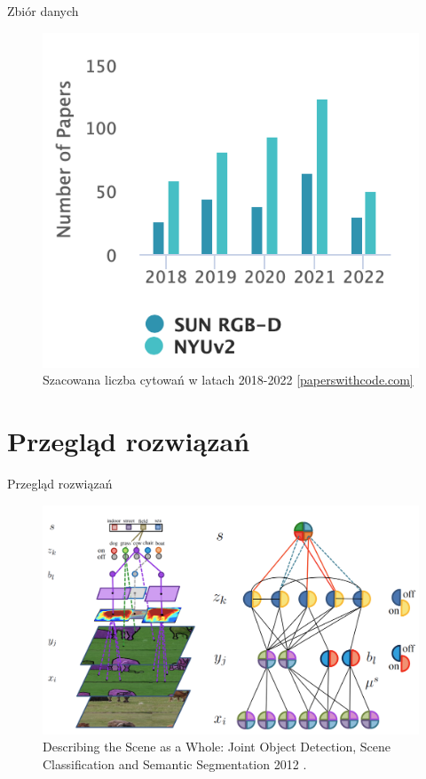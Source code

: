 \documentclass[10pt]{beamer}
\begin{document}
\begin{frame}{Zbiór danych}
    \begin{figure}
        \includegraphics[height=0.7\textheight]{images/stats-dataset.png}
        \caption[]{Szacowana liczba cytowań w latach 2018-2022 \href{https://paperswithcode.com/dataset/sun-rgb-d}{[paperswithcode.com]}}
    \end{figure}
\end{frame}
\section[Przegląd rozwiązań]{Przegląd rozwiązań}
\begin{frame}{Przegląd rozwiązań}

    \begin{figure}
        \includegraphics[width=\textwidth]{images/joint-segmentation-and-classification.png}
        \caption{Describing the Scene as a Whole: Joint Object Detection, Scene Classification and Semantic Segmentation 2012 \cite{yao2012describing}.}
    \end{figure}
\end{frame}
    
\end{document}
